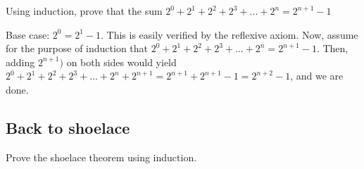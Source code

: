 \documentclass[11pt]{article}
\begin{document}
\begin{problem}
Using induction, prove that the sum $2^0 + 2^1 + 2^2 + 2^3 + ... + 2^n = 2^{n+1} - 1$
\end{problem}

\begin{solution}
Base case: $2^0=2^1-1$. This is easily verified by the reflexive axiom. Now, assume for the purpose of induction that $2^0 + 2^1 + 2^2 + 2^3 + ... + 2^n = 2^{n+1} - 1$. Then, adding $2^{n+1})$ on both sides would yield $2^0 + 2^1 + 2^2 + 2^3 + ... + 2^n + 2^{n+1} = 2^{n+1} +2^{n+1} - 1 = 2^{n+2} - 1$, and we are done.
\end{solution}

\subsection{Back to shoelace}

\begin{problem}
Prove the shoelace theorem using induction.
\end{problem}
\end{document}
